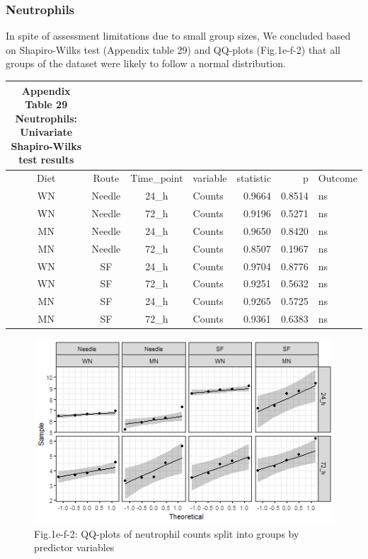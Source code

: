 \documentclass[
  12pt,
  letterpaper,
]{article}
\begin{document}
\subsubsection{Neutrophils}\label{neutrophils-2}

In spite of assessment limitations due to small group sizes, We concluded based on Shapiro-Wilks test (Appendix table 29) and QQ-plots (Fig.1e-f-2) that all groups of the dataset were likely to follow a normal distribution.

\begingroup
\fontsize{12.0pt}{14.4pt}\selectfont
\begin{longtable}{ccclrrl}
\caption*{
{\large \textbf{Appendix Table 29}} \\ 
{\small \textbf{Neutrophils: Univariate Shapiro-Wilks test results}}
} \\ 
\toprule
{Diet} & {Route} & Time\_point & {variable} & {statistic} & {p} & {Outcome} \\ 
\midrule\addlinespace[2.5pt]
WN & Needle & 24\_h & Counts & 0.9664 & 0.8514 & ns \\ 
WN & Needle & 72\_h & Counts & 0.9196 & 0.5271 & ns \\ 
MN & Needle & 24\_h & Counts & 0.9650 & 0.8420 & ns \\ 
MN & Needle & 72\_h & Counts & 0.8507 & 0.1967 & ns \\ 
WN & SF & 24\_h & Counts & 0.9704 & 0.8776 & ns \\ 
WN & SF & 72\_h & Counts & 0.9251 & 0.5632 & ns \\ 
MN & SF & 24\_h & Counts & 0.9265 & 0.5725 & ns \\ 
MN & SF & 72\_h & Counts & 0.9361 & 0.6383 & ns \\ 
\bottomrule
\end{longtable}
\endgroup

\begin{figure}[H]

{\centering \includegraphics[width=0.95\linewidth,]{Statistics_Report_files/figure-latex/qq-plot-figure-1e-f-neutrophils-1} 

}

\caption{Fig.1e-f-2: QQ-plots of neutrophil counts split into groups by predictor variables}\label{fig:qq-plot-figure-1e-f-neutrophils}
\end{figure}
\end{document}
